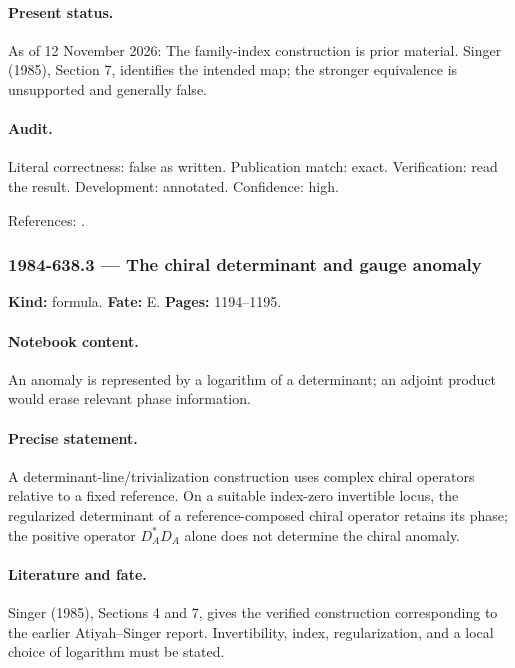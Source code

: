 \paragraph{Present status.} As of 12 November 2026: The family-index construction is prior material. Singer (1985), Section 7, identifies the intended map; the stronger equivalence is unsupported and generally false.

\paragraph{Audit.} Literal correctness: false as written. Publication match: exact. Verification: read the result. Development: annotated. Confidence: high.

\noindent References: \citep{atiyahsinger1984dirac,singer1985families}.\par

\subsubsection{1984-638.3 --- The chiral determinant and gauge anomaly}

\label{item:1984-638.3}

\noindent\textbf{Kind:} formula. \textbf{Fate:} E. \textbf{Pages:} 1194--1195.\par

\paragraph{Notebook content.} An anomaly is represented by a logarithm of a determinant; an adjoint product would erase relevant phase information.

\paragraph{Precise statement.} A determinant-line/trivialization construction uses complex chiral operators relative to a fixed reference. On a suitable index-zero invertible locus, the regularized determinant of a reference-composed chiral operator retains its phase; the positive operator \(D_A^*D_A\) alone does not determine the chiral anomaly.

\paragraph{Literature and fate.} Singer (1985), Sections 4 and 7, gives the verified construction corresponding to the earlier Atiyah--Singer report. Invertibility, index, regularization, and a local choice of logarithm must be stated.

